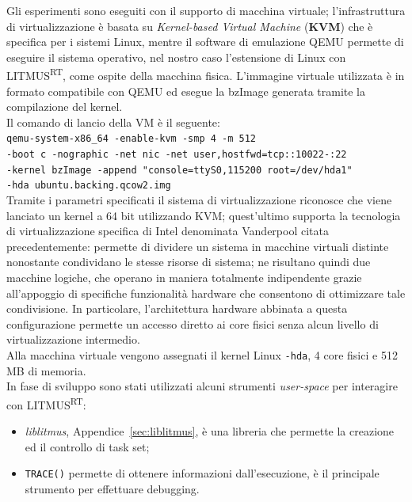 Gli esperimenti sono eseguiti con il supporto di macchina virtuale; l'infrastruttura di virtualizzazione è basata su \textit{Kernel-based Virtual Machine} (\textbf{KVM}) che è specifica per i sistemi Linux, mentre il software di emulazione QEMU permette di eseguire il sistema operativo, nel nostro caso l'estensione di Linux con LITMUS\textsuperscript{RT}, come ospite della macchina fisica. L'immagine virtuale utilizzata è in formato compatibile con QEMU ed esegue la bzImage generata tramite la compilazione del kernel.\\

Il comando di lancio della VM è il seguente:\\

\texttt{qemu-system-x86\_64 -enable-kvm -smp 4 -m 512 \\
-boot c -nographic -net nic -net user,hostfwd=tcp::10022-:22 \\
-kernel bzImage -append "console=ttyS0,115200 root=/dev/hda1" \\ 
-hda ubuntu.backing.qcow2.img}\\

Tramite i parametri specificati il sistema di virtualizzazione riconosce che viene lanciato un kernel a 64 bit utilizzando KVM; quest'ultimo supporta la tecnologia di virtualizzazione specifica di Intel denominata Vanderpool citata precedentemente: permette di dividere un sistema in macchine virtuali distinte nonostante condividano le stesse risorse di sistema; ne risultano quindi due macchine logiche, che operano in maniera totalmente indipendente grazie all'appoggio di specifiche funzionalità hardware che consentono di ottimizzare tale condivisione. In particolare, l'architettura hardware abbinata a questa configurazione permette un accesso diretto ai core fisici senza alcun livello di virtualizzazione intermedio.\\
Alla macchina virtuale vengono assegnati il kernel Linux \texttt{-hda}, 4 core fisici e 512 MB di memoria.\\

In fase di sviluppo sono stati utilizzati alcuni strumenti \textit{user-space} per interagire con LITMUS\textsuperscript{RT}:

\begin{itemize}
  \item \textit{liblitmus}, Appendice~\ref{sec:liblitmus}, è una libreria che permette la creazione ed il controllo di task set;
  \item \texttt{TRACE()} permette di ottenere informazioni dall'esecuzione, è il principale strumento per effettuare debugging.\\
\end{itemize}

